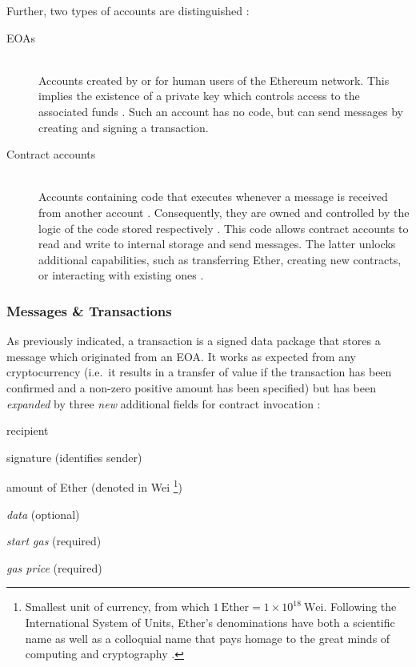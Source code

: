 \pagebreak

Further, two types of accounts are distinguished \cite[p.~17]{ethereumWhitepaperGitHub}:

\begin{description}
	\item[\acp{EOA}]
	\hfill \\
	Accounts created by or for human users of the Ethereum network. This implies the existence of a private key which controls access to the associated funds \cite[p.~13]{Antonopoulos.2018}. Such an account has no code, but can send messages by creating and signing a transaction.
	\item[Contract accounts]
	\hfill \\
	Accounts containing code that executes whenever a message is received from another account \cite[p.~13]{Antonopoulos.2018}. Consequently, they are owned and controlled by the logic of the code stored respectively \cite[p.~57]{Antonopoulos.2018}. This code allows contract accounts to read and write to internal storage and send messages. The latter unlocks additional capabilities, such as transferring Ether, creating new contracts, or interacting with existing ones \cite[p.~19]{ethereumWhitepaperGitHub}.
\end{description}

\subsubsection{Messages \& Transactions}
\label{sec:messagesTransactions}
As previously indicated, a transaction is a signed data package that stores a message which originated from an \ac{EOA}. It works as expected from any cryptocurrency (i.e.~it results in a transfer of value if the transaction has been confirmed and a non-zero positive amount has been specified) but has been \textit{expanded} by three \textit{new} additional fields for contract invocation \cite[p.~18]{ethereumWhitepaperGitHub}: 

\begin{AutoMultiColItemize}
  \item recipient
  \item signature (identifies sender)
  \item amount of Ether (denoted in Wei \footnote{Smallest unit of currency, from which $1\ \text{Ether} = 1 \times 10^{18}\ \text{Wei}$. Following the International System of Units, Ether's denominations have both a scientific name as well as a colloquial name that pays homage to the great minds of computing and cryptography \cite[p.~40]{Antonopoulos.2018}.})
  \item \textit{data} (optional)
  \item \textit{start gas} (required)
  \item \textit{gas price} (required)
\end{AutoMultiColItemize}

